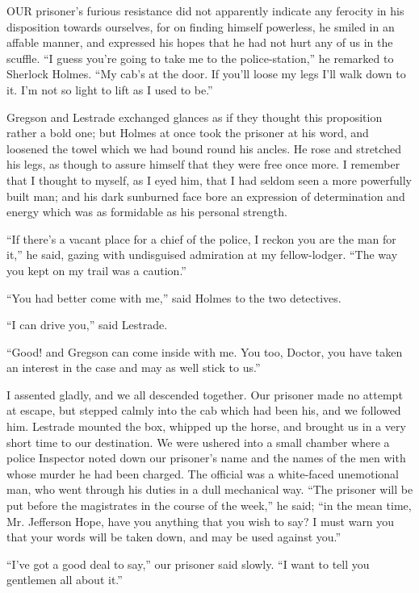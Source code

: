 \documentclass[12pt]{book}
\begin{document}
OUR prisoner’s furious resistance did not apparently indicate any ferocity in his disposition towards ourselves, for on finding himself powerless, he smiled in an affable manner, and expressed his hopes that he had not hurt any of us in the scuffle. “I guess you’re going to take me to the police-station,” he remarked to Sherlock Holmes. “My cab’s at the door. If you’ll loose my legs I’ll walk down to it. I’m not so light to lift as I used to be.” 

Gregson and Lestrade exchanged glances as if they thought this proposition rather a bold one; but Holmes at once took the prisoner at his word, and loosened the towel which we had bound round his ancles. He rose and stretched his legs, as though to assure himself that they were free once more. I remember that I thought to myself, as I eyed him, that I had seldom seen a more powerfully built man; and his dark sunburned face bore an expression of determination and energy which was as formidable as his personal strength. 

“If there’s a vacant place for a chief of the police, I reckon you are the man for it,” he said, gazing with undisguised admiration at my fellow-lodger. “The way you kept on my trail was a caution.” 

“You had better come with me,” said Holmes to the two detectives. 

“I can drive you,” said Lestrade. 

“Good! and Gregson can come inside with me. You too, Doctor, you have taken an interest in the case and may as well stick to us.” 

I assented gladly, and we all descended together. Our prisoner made no attempt at escape, but stepped calmly into the cab which had been his, and we followed him. Lestrade mounted the box, whipped up the horse, and brought us in a very short time to our destination. We were ushered into a small chamber where a police Inspector noted down our prisoner’s name and the names of the men with whose murder he had been charged. The official was a white-faced unemotional man, who went through his duties in a dull mechanical way. “The prisoner will be put before the magistrates in the course of the week,” he said; “in the mean time, Mr. Jefferson Hope, have you anything that you wish to say? I must warn you that your words will be taken down, and may be used against you.” 

“I’ve got a good deal to say,” our prisoner said slowly. “I want to tell you gentlemen all about it.” 
\end{document}

